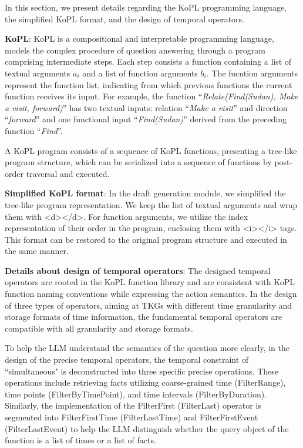 \documentclass[10pt, a4paper]{article}
\begin{document}
In this section, we present details regarding the KoPL programming language, the simplified KoPL format, and the design of temporal operators.

\textbf{KoPL}: KoPL\cite{cao2022kqa} is a compositional and interpretable programming language, models the complex procedure of question answering through a program comprising intermediate steps. Each step consists a function containing a list of textual arguments $a_i$ and a list of function arguments $b_i$. The fucntion arguments represent the function list, indicating from which previous functions the current function receives its input.
For example, the function ``\textit{Relate(Find(Sudan), Make a visit, forward)}'' has two textual inputs: relation ``\textit{Make a visit}'' and direction ``\textit{forward}'' and one functional input ``\textit{Find(Sudan)}'' derived from the preceding function ``\textit{Find}''.

A KoPL program consists of a sequence of KoPL functions, presenting a tree-like program structure, which can be serialized into a sequence of functions by post-order traversal and executed.

\textbf{Simplified KoPL format}: In the draft generation module, we simplified the tree-like program representation. We keep the list of textual arguments and wrap them with <d></d>. For function arguments, we utilize the index representation of their order in the program, enclosing them with <i></i> tags. This format can be restored to the original program structure and executed in the same manner.

\textbf{Details about design of temporal operators}: 
The designed temporal operators are rooted in the KoPL function library and are consistent with KoPL function naming conventions while expressing the action semantics. In the design of three types of operators, aiming at TKGs with different time granularity and storage formats of time information, the fundamental temporal operators are compatible with all granularity and storage formats. 

To help the LLM understand the semantics of the question more clearly, in the design of the precise temporal operators, the temporal constraint of ``simultaneous" is deconstructed into three specific precise operations. These operations include retrieving facts utilizing coarse-grained time (FilterRange), time points (FilterByTimePoint), and time intervals (FilterByDuration). Similarly, the implementation of the FilterFirst (FilterLast) operator is segmented into FilterFirstTime (FilterLastTime) and FilterFirstEvent (FilterLastEvent) to help the LLM distinguish whether the query object of the function is a list of times or a list of facts.
\end{document}
